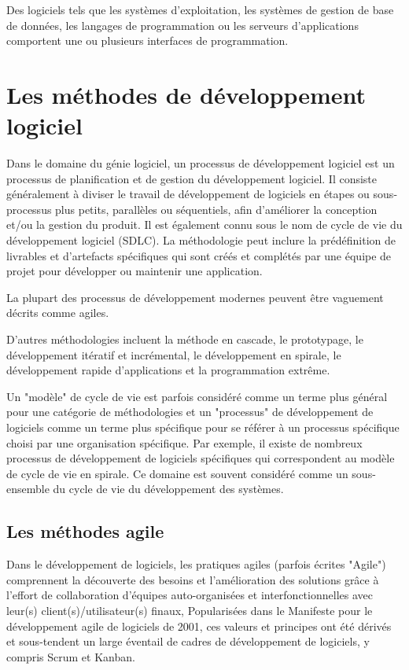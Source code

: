 Des logiciels tels que les systèmes d'exploitation, les systèmes de gestion de base de données,
les langages de programmation ou les serveurs d'applications comportent une ou plusieurs
interfaces de programmation.

\section{Les méthodes de développement logiciel}\label{sec:methode-de-developpement-logiciel}
Dans le domaine du génie logiciel, un processus de développement logiciel est un processus de
planification et de gestion du développement logiciel. Il consiste généralement à diviser
le travail de développement de logiciels en étapes ou sous-processus plus petits, parallèles ou
séquentiels, afin d'améliorer la conception et/ou la gestion du produit. Il est également
connu sous le nom de cycle de vie du développement logiciel (SDLC). La méthodologie peut inclure
la prédéfinition de livrables et d'artefacts spécifiques qui sont créés et complétés par une équipe
de projet pour développer ou maintenir une application.

La plupart des processus de développement modernes peuvent être vaguement décrits comme agiles.

D'autres méthodologies incluent la méthode en cascade, le prototypage, le développement itératif et
incrémental, le développement en spirale, le développement rapide d'applications et la programmation
extrême.

Un "modèle" de cycle de vie est parfois considéré comme un terme plus général pour une catégorie
de méthodologies et un "processus" de développement de logiciels comme un terme plus spécifique
pour se référer à un processus spécifique choisi par une organisation spécifique. Par exemple,
il existe de nombreux processus de développement de logiciels spécifiques qui correspondent au
modèle de cycle de vie en spirale. Ce domaine est souvent considéré comme un sous-ensemble du cycle
de vie du développement des systèmes.

\subsection{Les méthodes agile}\label{subsec:methodes-agiles}
Dans le développement de logiciels, les pratiques agiles (parfois écrites "Agile") comprennent
la découverte des besoins et l'amélioration des solutions grâce à l'effort de collaboration
d'équipes auto-organisées et interfonctionnelles avec leur(s) client(s)/utilisateur(s) finaux,
Popularisées dans le Manifeste pour le développement agile de logiciels de 2001, ces valeurs et
principes ont été dérivés et sous-tendent un large éventail de cadres de développement de logiciels,
y compris Scrum et Kanban.


